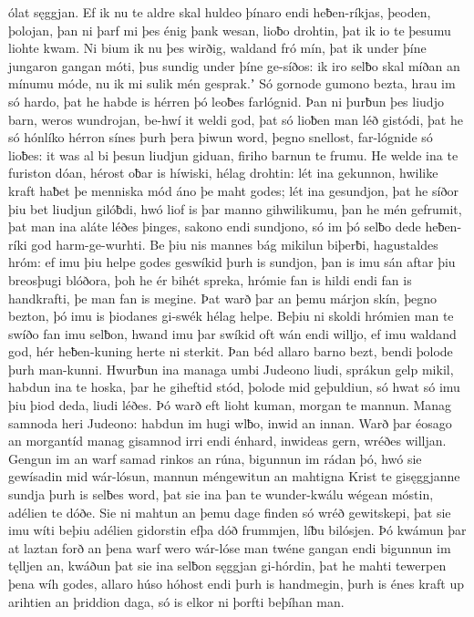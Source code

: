 ólat sęggjan. Ef ik nu te aldre skal
huldeo þínaro endi heƀen-ríkjas,
þeoden, þolojan, þan ni þarf mi þes énig þank wesan,
lioƀo drohtin, þat ik io te þesumu liohte kwam.
Ni bium ik nu þes wirðig, waldand fró mín,
þat ik under þíne jungaron gangan móti,
þus sundig under þíne ge-síðos: ik iro selƀo skal
míðan an mínumu móde, nu ik mi sulik mén gesprak.ʼ
Só gornode gumono bezta,
hrau im só hardo, þat he habde is hérren þó
leoƀes farlógnid. Þan ni þurƀun þes liudjo barn,
weros wundrojan, be-hwí it weldi god,
þat só lioƀen man léð gistódi,
þat he só hónlíko hérron sínes
þurh þera þiwun word, þegno snellost,
far-lógnide só lioƀes: it was al bi þesun liudjun giduan,
firiho barnun te frumu. He welde ina te furiston dóan,
hérost oƀar is híwiski, hélag drohtin:
lét ina gekunnon, hwilike kraft haƀet
þe menniska mód áno þe maht godes;
lét ina gesundjon, þat he síðor þiu bet
liudjun gilóƀdi, hwó liof is þar
manno gihwilikumu, þan he mén gefrumit,
þat man ina aláte léðes þinges,
sakono endi sundjono, só im þó selƀo dede
heƀen-ríki god harm-ge-wurhti.
Be þiu nis mannes bág mikilun biþerƀi,
hagustaldes hróm: ef imu þiu helpe godes
geswíkid þurh is sundjon, þan is imu sán aftar þiu
breosþugi blóðora, þoh he ér bihét spreka,
hrómie fan is hildi endi fan is handkrafti,
þe man fan is megine. Þat warð þar an þemu márjon skín,
þegno bezton, þó imu is þiodanes gi-swék
hélag helpe. Beþiu ni skoldi hrómien man
te swíðo fan imu selƀon, hwand imu þar swíkid oft
wán endi willjo, ef imu waldand god,
hér heƀen-kuning herte ni sterkit.
Þan béd allaro barno bezt, bendi þolode
þurh man-kunni. Hwurƀun ina managa umbi
Judeono liudi, sprákun gelp mikil,
habdun ina te hoska, þar he giheftid stód,
þolode mid geþuldiun, só hwat só imu þiu þiod deda,
liudi léðes. Þó warð eft lioht kuman,
morgan te mannun. Manag samnoda
heri Judeono: habdun im hugi wlƀo,
inwid an innan. Warð þar éosago
an morgantíd manag gisamnod
irri endi énhard, inwideas gern,
wréðes willjan. Gengun im an warf samad
rinkos an rúna, bigunnun im rádan þó,
hwó sie gewísadin mid wár-lósun,
mannun méngewitun an mahtigna Krist
te gisęggjanne sundja þurh is selƀes word,
þat sie ina þan te wunder-kwálu wégean móstin,
adélien te dóðe. Sie ni mahtun an þemu dage finden
só wréð gewitskepi, þat sie imu wíti beþiu
adélien gidorstin efþa dóð frummjen,
líƀu bilósjen. Þó kwámun þar at laztan forð
an þena warf wero wár-lóse man
twéne gangan endi bigunnun im tęlljen an,
kwáðun þat sie ina selƀon sęggjan gi-hórdin,
þat he mahti tewerpen þena wíh godes,
allaro húso hóhost endi þurh is handmegin,
þurh is énes kraft up arihtien
an þriddion daga, só is elkor ni þorfti beþíhan man.
